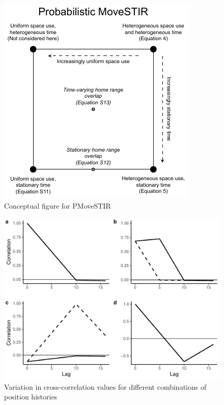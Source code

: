 \documentclass[letterpaper]{article}
\begin{document}
\begin{figure}
    \includegraphics[width=\textwidth]{figures/conceptual_figure_pmovestir.pdf}
    \caption{Conceptual figure for PMoveSTIR}
	\label{fig:square}
\end{figure}

\begin{figure}
    \includegraphics[width=\textwidth]{figures/example_xcorrs.pdf}
    \caption{Variation in cross-correlation values for different combinations of position histories}
	\label{fig:xcorrs}
\end{figure}
\end{document}
